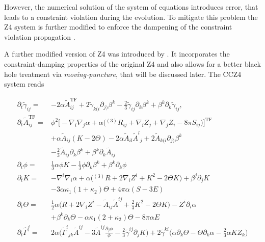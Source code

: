{    However, the numerical solution of the system of equations introduces error, that leads to a constraint violation during the evolution. 
    To mitigate this problem the Z4 system is further modified to enforce the dampening of the constraint violation propagation \cite{Gundlach:2005eh}.
    
    A further modified version of Z4 was introduced by \cite{Alic:2011gg}. 
    It incorporates the constraint-damping properties of the original Z4 and also allows for a better black hole treatment via \textit{moving-puncture}, that will be discussed later. 
    The CCZ4 system reads 
    
    \begin{align}
    \partial_{t}\widetilde{\gamma}_{ij} = & -2\alpha\widetilde{A}_{ij}^{\text{TF}} + 2\widetilde{\gamma}_{k(i}\partial_{j)}\beta^k - \frac{2}{3}\widetilde{\gamma}_{ij}\partial_k \beta^k + \beta^k\partial_k\widetilde{\gamma}_{ij}, \\
    \partial_{t}\widetilde{A}_{ij}^{\text{TF}} = & \phi^2\big[-\nabla_i\nabla_j\alpha + \alpha\big({^{(3)}R}_{ij}+\nabla_{i}Z_{j} + \nabla_{j}Z_{i}- 8\pi S_{ij}\big)\big]^{\text{TF}} \\
    & + \alpha\widetilde{A}_{ij}(K-2\Theta)-2\alpha\widetilde{A}_{il}{\widetilde{A}^l}_{j} + 2\widetilde{A}_{k(i}\partial_{j)}\beta^{k} \\
    & -\frac{2}{3}\widetilde{A}_{ij}\partial_{k}\beta^{k} + \beta^{k}\partial_{k}\widetilde{A}_{ij} \\
    \partial_{t} \phi = & \frac{1}{3}\alpha\phi K - \frac{1}{3}\phi\partial_{k}\beta^{k} + \beta^{k}\partial_{k}\phi \\
    \partial_{t}K = &-\nabla^{i}\nabla_{i}\alpha + \alpha\big({^{(3)}R} + 2\nabla_{i}Z^{i} + K^2 - 2\Theta K\big) + \beta^{j}\partial_{j}K \\
    & - 3\alpha\kappa_1(1+\kappa_2)\Theta + 4\pi\alpha (S-3E) \\
    \partial_{t}\Theta = &\frac{1}{2}\alpha\Big(R + 2\nabla_{i}Z^{i} - \widetilde{A}_{ij}\widetilde{A}^{ij} + \frac{2}{3}K^2 - 2\Theta K\Big) - Z^{i}\partial_{i}\alpha \\
    & + \beta^{k}\partial_{k}\Theta - \alpha\kappa_1(2 + \kappa_2)\Theta - 8\pi\alpha E \\
    \partial_{t}\hat{\Gamma}^j = & 2\alpha\Bigg({\widetilde{\Gamma}^i}_{jk}\widetilde{A}^{ij} - 	3\widetilde{A}^{ij}\frac{\partial_{j}\phi}{\phi} -\frac{2}{3}\widetilde{\gamma}^{ij}\partial_{j}K\Bigg) + 2\widetilde{\gamma}^{ki}\Big(\alpha\partial_{k}\Theta - \Theta\partial_{k}\alpha - \frac{2}{3}\alpha K Z_{k}\Big) \\

\end{align}}
